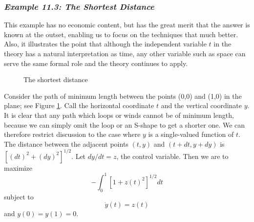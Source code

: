 \subsubsection*{\textit{Example 11.3: The Shortest Distance}}

This example has no economic content, but has the great merit that the answer is known at the outset, enabling us to focus on the techniques that much better. Also, it illustrates the point that although the independent variable $t$ in the theory has a natural interpretation as time, any other variable such as space can serve the same formal role and the theory continues to apply.

\begin{figure}[!htb] %
\centering %
\caption{The shortest distance} %
\label{Fig11.1} %
\end{figure}

Consider the path of minimum length between the points (0,0) and (1,0) in the plane; see Figure \ref{Fig11.1}. Call the horizontal coordinate $t$ and the vertical coordinate $y$. It is clear that any path which loops or winds cannot be of minimum length, because we can simply omit the loop or an S-shape to get a shorter one. We can therefore restrict discussion to the case where $y$ is a single-valued function of $t$. The distance between the adjacent points $(t,y)$ and $(t + dt,y + dy)$ is $[(dt)^2 + (dy)^2]^{1/2}$. Let $dy/dt = z$, the control variable. Then we are to maximize
\begin{equation} \label{equa11.23}
 - \int_0^1 [1+z(t)^2]^{1/2} dt
\end{equation}
subject to 
\begin{equation} \label{equa11.24}
  \dot{y}(t) = z(t)
\end{equation}
and $y(0)=y(1)=0$.


